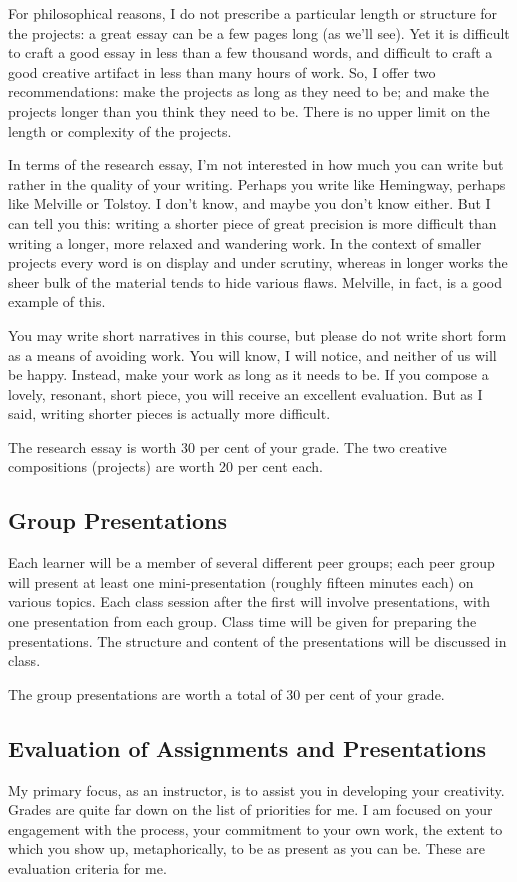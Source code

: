 \documentclass[10pt,DIV09,letterpaper,oneside,headsepline]{scrreprt}
\begin{document}
For philosophical reasons, I do not prescribe a particular length or structure for the projects: a great essay can be a few pages long (as we'll see). Yet it is difficult to craft a good essay in less than a few thousand words, and difficult to craft a good creative artifact in less than many hours of work. So, I offer two recommendations: make the projects as long as they need to be; and make the projects longer than you think they need to be. There is no upper limit on the length or complexity of the projects.

In terms of the research essay, I'm not interested in how much you can write but rather in the quality of your writing. Perhaps you write like Hemingway, perhaps like Melville or Tolstoy. I don't know, and maybe you don't know either. But I can tell you this: writing a shorter piece of great precision is more difficult than writing a longer, more relaxed and wandering work. In the context of smaller projects every word is on display and under scrutiny, whereas in longer works the sheer bulk of the material tends to hide various flaws. Melville, in fact, is a good example of this.

You may write short narratives in this course, but please do not write
short form as a means of avoiding work. You will know, I will notice,
and neither of us will be happy. Instead, make your work as long as it
needs to be. If you compose a lovely, resonant, short piece, you will
receive an excellent evaluation. But as I said, writing shorter pieces
is actually more difficult.

The research essay is worth 30 per cent of your grade. The two creative compositions (projects) are worth 20 per cent each.

\subsection{Group Presentations}

Each learner will be a member of several different peer groups; each
peer group will present at least one mini-presentation (roughly fifteen minutes each) on various topics. Each class session after the first will involve presentations, with one presentation
from each group. Class time will be given for preparing the presentations. The structure and content of the presentations will be discussed in class.

The group presentations are worth a total of 30 per cent of your grade.

\subsection{Evaluation of Assignments and Presentations}
My primary focus, as an instructor, is to assist you in developing
your creativity. Grades are quite far down on the list of priorities
for me. I am focused on your engagement with the process, your
commitment to your own work, the extent to which you show up,
metaphorically, to be as present as you can be. These are evaluation
criteria for me.
\end{document}

